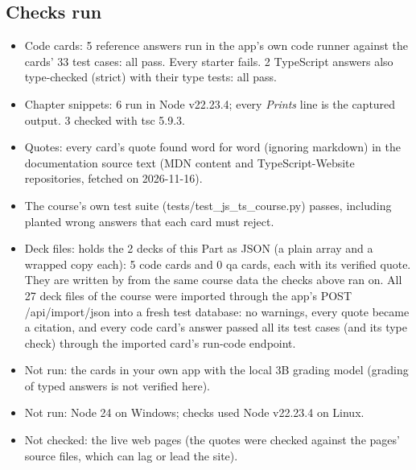 \documentclass[10pt]{article}
\newcommand{\code}[1]{{\ttfamily\small #1}}
\begin{document}
\subsection*{Checks run}
{\footnotesize\begin{itemize}
\item Code cards: 5 reference answers run in the app's own code runner against the cards' 33 test cases: all pass. Every starter fails. 2 TypeScript answers also type-checked (strict) with their type tests: all pass.
\item Chapter snippets: 6 run in Node v22.23.4; every \textit{Prints} line is the captured output. 3 checked with tsc 5.9.3.
\item Quotes: every card's quote found word for word (ignoring markdown) in the documentation source text (MDN content and TypeScript-Website repositories, fetched on 2026-11-16).
\item The course's own test suite (\code{tests/test\_js\_ts\_course.py}) passes, including planted wrong answers that each card must reject.
\item Deck files:  holds the 2 decks of this Part as JSON (a plain array and a wrapped copy each): 5 code cards and 0 qa cards, each with its verified quote. They are written by  from the same course data the checks above ran on. All 27 deck files of the course were imported through the app's \code{POST /api/import/json} into a fresh test database: no warnings, every quote became a citation, and every code card's answer passed all its test cases (and its type check) through the imported card's run-code endpoint.
\item Not run: the cards in your own app with the local 3B grading model (grading of typed answers is not verified here).
\item Not run: Node 24 on Windows; checks used Node v22.23.4 on Linux.
\item Not checked: the live web pages (the quotes were checked against the pages' source files, which can lag or lead the site).
\end{itemize}}
\end{document}
